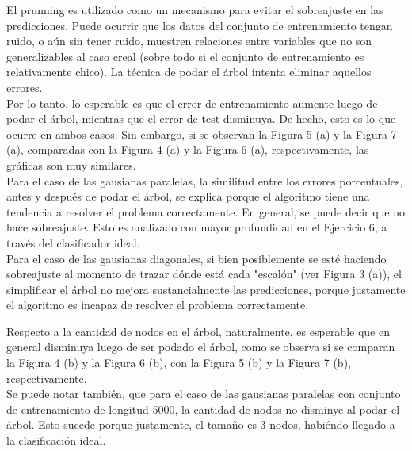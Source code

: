 \documentclass[12pt, a4paper]{article}
\begin{document}
\bigskip

El prunning es utilizado como un mecanismo para evitar el sobreajuste en las predicciones. Puede ocurrir que los datos del conjunto de entrenamiento tengan ruido, o aún sin tener ruido, muestren relaciones entre variables que no son generalizables al caso creal (sobre todo si el conjunto de entrenamiento es relativamente chico). La técnica de podar el árbol intenta eliminar aquellos errores.\\
Por lo tanto, lo esperable es que el error de entrenamiento aumente luego de podar el árbol, mientras que el error de test disminuya. De hecho, esto es lo que ocurre en ambos casos. Sin embargo, si se observan la Figura 5 (a) y la Figura 7 (a), comparadas con la Figura 4 (a) y la Figura 6 (a), respectivamente, las gráficas son muy similares.
\\ Para el caso de las gausianas paralelas, la similitud entre los errores porcentuales, antes y después de podar el árbol, se explica porque el algoritmo tiene una tendencia a resolver el problema correctamente. En general, se puede decir que no hace sobreajuste. Esto es analizado con mayor profundidad en el Ejercicio 6, a través del clasificador ideal. 
\\ Para el caso de las gausianas diagonales, si bien posiblemente se esté haciendo sobreajuste al momento de trazar dónde está cada "escalón" (ver Figura 3 (a)), el simplificar el árbol no mejora sustancialmente las predicciones, porque justamente el algoritmo es incapaz de resolver el problema correctamente.

\medskip

Respecto a la cantidad de nodos en el árbol, naturalmente, es esperable que en general disminuya luego de ser podado el árbol, como se observa si se comparan la Figura 4 (b) y la Figura 6 (b), con la Figura 5 (b) y la Figura 7 (b), respectivamente.\\
Se puede notar también, que para el caso de las gausianas paralelas con conjunto de entrenamiento de longitud 5000, la cantidad de nodos no disminye al podar el árbol. Esto sucede porque justamente, el tamaño es 3 nodos, habiéndo llegado a la clasificación ideal.
\end{document}
